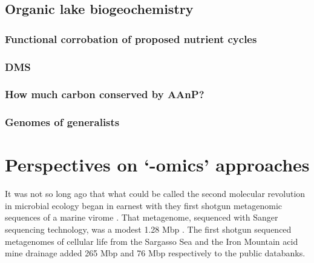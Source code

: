 \subsection{Organic lake biogeochemistry}

\subsubsection{Functional corrobation of proposed nutrient cycles}

\subsubsection{DMS}

\subsubsection{How much carbon conserved by AAnP?}

\subsubsection{Genomes of generalists}




\section{Perspectives on `-omics' approaches }
It was not so long ago that what could be called the second molecular revolution in microbial ecology began in earnest with they first shotgun metagenomic sequences of a marine virome \cite{Breitbart2002}.
That metagenome, sequenced with Sanger sequencing technology, was a modest 1.28 Mbp \cite{Breitbart2002}.
The first shotgun sequenced metagenomes of cellular life from the Sargasso Sea \cite{Venter2004} and the Iron Mountain acid mine drainage \cite{Tyson2004} added 265 Mbp and 76 Mbp respectively to the public databanks.

